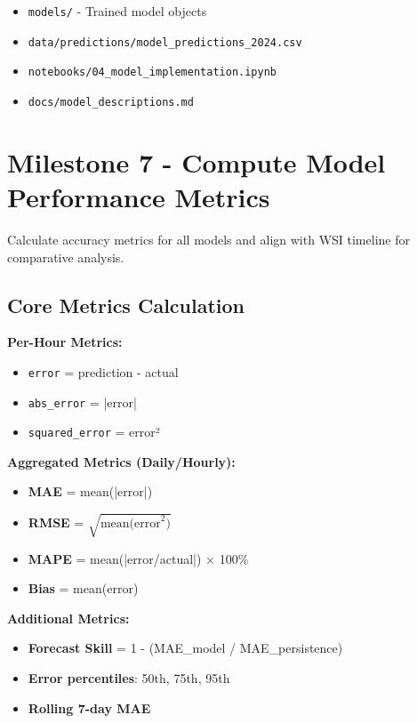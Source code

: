 \documentclass[11pt,a4paper]{article}
\begin{document}
\begin{deliverablebox}
\begin{itemize}
    \item \texttt{models/} - Trained model objects
    \item \texttt{data/predictions/model\_predictions\_2024.csv}
    \item \texttt{notebooks/04\_model\_implementation.ipynb}
    \item \texttt{docs/model\_descriptions.md}
\end{itemize}
\end{deliverablebox}

\section{Milestone 7 - Compute Model Performance Metrics}

\begin{objectivebox}
Calculate accuracy metrics for all models and align with WSI timeline for comparative analysis.
\end{objectivebox}

\subsection{Core Metrics Calculation}

\textbf{Per-Hour Metrics:}
\begin{itemize}
    \item \texttt{error} = prediction - actual
    \item \texttt{abs\_error} = |error|
    \item \texttt{squared\_error} = error²
\end{itemize}

\textbf{Aggregated Metrics (Daily/Hourly):}
\begin{itemize}
    \item \textbf{MAE} = mean(|error|)
    \item \textbf{RMSE} = $\sqrt{\text{mean(error}^2)}$
    \item \textbf{MAPE} = mean(|error/actual|) × 100\%
    \item \textbf{Bias} = mean(error)
\end{itemize}

\textbf{Additional Metrics:}
\begin{itemize}
    \item \textbf{Forecast Skill} = 1 - (MAE_model / MAE_persistence)
    \item \textbf{Error percentiles}: 50th, 75th, 95th
    \item \textbf{Rolling 7-day MAE}
\end{itemize}
\end{document}
